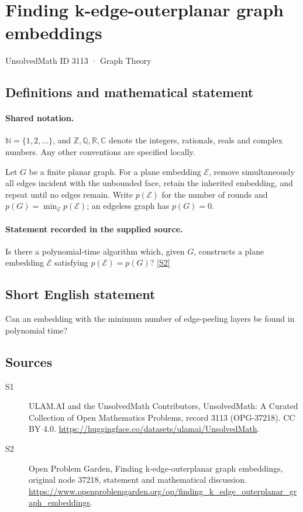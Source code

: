 \documentclass[11pt]{article}
\newcommand{\sref}[2]{\hyperlink{source:#1:#2}{[S#2]}}
\begin{document}
\setcounter{section}{3112}
\section{Finding k-edge-outerplanar graph embeddings}\label{3113}
{\small\sffamily UnsolvedMath ID 3113 · Graph Theory}
\subsection{Definitions and mathematical statement}

\paragraph{Shared notation.}$\mathbb N=\{1,2,\ldots\}$, and $\mathbb Z,\mathbb Q,\mathbb R,\mathbb C$ denote the integers, rationals, reals and complex numbers. Any other conventions are specified locally.


Let $G$ be a finite planar graph. For a plane embedding $\mathcal E$, remove simultaneously all edges incident with the unbounded face, retain the inherited embedding, and repeat until no edges remain. Write $p(\mathcal E)$ for the number of rounds and $p(G)=\min_{\mathcal E}p(\mathcal E)$; an edgeless graph has $p(G)=0$.
\paragraph{Statement recorded in the supplied source.}
Is there a polynomial-time algorithm which, given $G$, constructs a plane embedding $\mathcal E$ satisfying $p(\mathcal E)=p(G)$? \sref{3113}{2}
\subsection{Short English statement}
Can an embedding with the minimum number of edge-peeling layers be found in polynomial time?
\subsection{Sources}
\begin{description}
\item[\hypertarget{source:3113:1}{S1}] ULAM.AI and the UnsolvedMath Contributors, UnsolvedMath: A Curated Collection of Open Mathematics Problems, record 3113 (OPG-37218). CC BY 4.0. \url{https://huggingface.co/datasets/ulamai/UnsolvedMath}.
\item[\hypertarget{source:3113:2}{S2}] Open Problem Garden, Finding k-edge-outerplanar graph embeddings, original node 37218, statement and mathematical discussion. \url{https://www.openproblemgarden.org/op/finding_k_edge_outerplanar_graph_embeddings}.
\end{description}
\label{end:3113}
\end{document}
